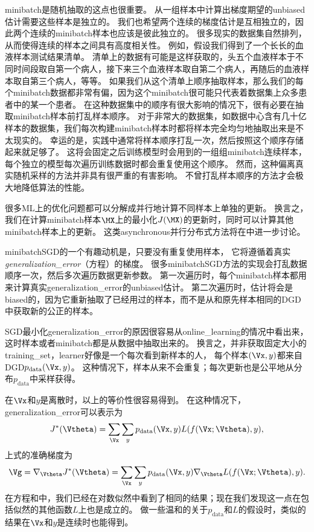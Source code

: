 \gls{minibatch}是随机抽取的这点也很重要。
从一组样本中计算出梯度期望的\gls{unbiased}估计需要这些样本是独立的。
我们也希望两个连续的梯度估计是互相独立的，因此两个连续的\gls{minibatch}样本也应该是彼此独立的。
很多现实的数据集自然排列，从而使得连续的样本之间具有高度相关性。
例如，假设我们得到了一个长长的血液样本测试结果清单。
清单上的数据有可能是这样获取的，头五个血液样本于不同时间段取自第一个病人，接下来三个血液样本取自第二个病人，再随后的血液样本取自第三个病人，等等。
如果我们从这个清单上顺序抽取样本，那么我们的每个\gls{minibatch}数据都非常有偏，因为这个\gls{minibatch}很可能只代表着数据集上众多患者中的某一个患者。
在这种数据集中的顺序有很大影响的情况下，很有必要在抽取\gls{minibatch}样本前打乱样本顺序。
对于非常大的数据集，如数据中心含有几十亿样本的数据集，我们每次构建\gls{minibatch}样本时都将样本完全均匀地抽取出来是不太现实的。
幸运的是，实践中通常将样本顺序打乱一次，然后按照这个顺序存储起来就足够了。
这将会固定之后训练模型时会用到的一组组\gls{minibatch}连续样本，每个独立的模型每次遍历训练数据时都会重复使用这个顺序。
然而，这种偏离真实随机采样的方法并非具有很严重的有害影响。
不曾打乱样本顺序的方法才会极大地降低算法的性能。


很多\gls{ML}上的优化问题都可以分解成并行地计算不同样本上单独的更新。
换言之，我们在计算\gls{minibatch}样本$\MX$上的最小化$J(\MX)$的更新时，同时可以计算其他\gls{minibatch}样本上的更新。
这类\gls{asynchronous}并行分布式方法将在中进一步讨论。


\gls{minibatch}\gls{SGD}的一个有趣动机是，只要没有重复使用样本，
它将遵循着真实\emph{\gls{generalization_error}}（方程）的梯度。
很多\gls{minibatch}\gls{SGD}方法的实现会打乱数据顺序一次，然后多次遍历数据更新参数。
第一次遍历时，每个\gls{minibatch}样本都用来计算真实\gls{generalization_error}的\gls{unbiased}估计。
第二次遍历时，估计将会是\gls{biased}的，因为它重新抽取了已经用过的样本，而不是从和原先样本相同的\gls{DGD}中获取新的公正的样本。


\gls{SGD}最小化\gls{generalization_error}的原因很容易从\gls{online_learning}的情况中看出来，
这时样本或者\gls{minibatch}都是从数据中抽取出来的。
换言之，并非获取固定大小的\gls{training_set}，\gls{learner}好像是一个每次看到新样本的人，
每个样本$(\Vx,y)$都来自\gls{DGD}$p_{\text{data}}(\Vx,y)$。
这种情况下，样本从来不会重复；每次更新也是公平地从分布$p_\text{data}$中采样获得。


在$\Vx$和$y$是离散时，以上的等价性很容易得到。
在这种情况下，\gls{generalization_error}可以表示为
\begin{equation}
\label{eq:8.7}
    J^*(\Vtheta) = \sum_{\Vx} \sum_y p_{\text{data}}(\Vx, y) L(f(\Vx; \Vtheta),y),
\end{equation}
上式的准确梯度为
\begin{equation}
\label{eq:8.8}
    \Vg = \nabla_{\Vtheta} J^*(\Vtheta) = \sum_{\Vx} \sum_y p_{\text{data}}
    (\Vx, y) \nabla_{\Vtheta} L(f(\Vx;\Vtheta),y) .
\end{equation}
在方程和中，我们已经在对数似然中看到了相同的结果；现在我们发现这一点在包括似然的其他函数$L$上也是成立的。
做一些温和的关于$p_\text{data}$和$L$的假设时，类似的结果在$\Vx$和$y$是连续时也能得到。


